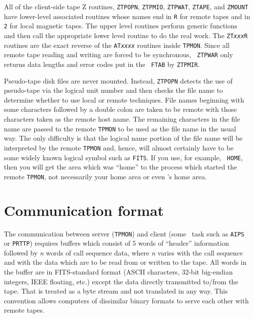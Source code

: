 All of the client-side tape Z routines, {\tt ZTPOPN}, {\tt ZTPMIO},
{\tt ZTPWAT}, {\tt ZTAPE}, and {\tt ZMOUNT} have lower-level
associated routines whose names end in {\tt R} for remote tapes and in
{\tt 2} for local magnetic tapes.  The upper level routines perform
generic functions and then call the appropriate lower level routine to
do the real work.  The {\tt ZT{\it xxx}R} routines are the exact
reverse of the {\tt AT{\it xxxx}} routines inside {\tt TPMON}.  Since
all remote tape reading and writing are forced to be synchronous, {\tt
ZTPWAR} only returns data lengths and error codes put in the {\tt
FTAB} by {\tt ZTPMIR}.

Pseudo-tape disk files are never mounted.  Instead, {\tt ZTPOPN}
detects the use of pseudo-tape via the logical unit number and then
checks the file name to determine whether to use local or remote
techniques.  File names beginning with some characters followed by a
double colon are taken to be remote with those characters taken as the
remote host name.  The remaining characters in the file name are
passed to the remote {\tt TPMON} to be used as the file name in the
usual way.  The only difficulty is that the logical name portion of
the file name will be interpreted by the remote {\tt TPMON} and,
hence, will almost certainly have to be some widely known logical
symbol such as \hbox{{\tt FITS}}.  If you use, for example, {\tt
HOME}, then you will get the area which was ``home'' to the process
which started the remote {\tt TPMON}, not necessarily your home area
or even \AIPS's home area.

\section{Communication format}

The communication between server ({\tt TPMON}) and client (some \AIPS\
task such as {\tt AIPS} or {\tt PRTTP}) requires buffers which consist
of 5 words of ``header'' information followed by {\it n} words of call
sequence data, where {\it n} varies with the call sequence and with
the data which are to be read from or written to the tape.  All words
in the buffer are in FITS-standard format (ASCII characters, 32-bit
big-endian integers, IEEE floating, etc.) except the data directly
transmitted to/from the tape.  That is treated as a byte stream and
not translated in any way.  This convention allows computers of
dissimilar binary formats to serve each other with remote tapes.

